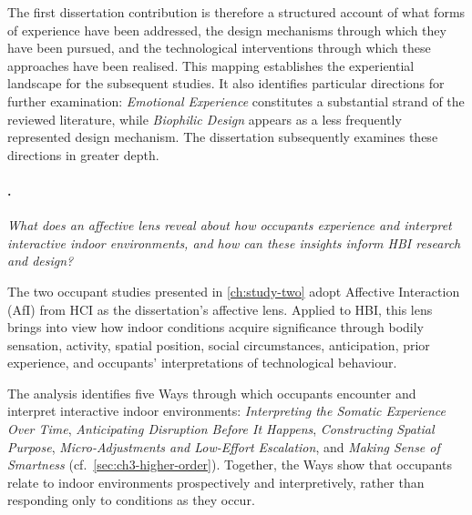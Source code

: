 The first dissertation contribution is therefore a structured account of what forms of experience have been addressed, the design mechanisms through which
they have been pursued, and the technological interventions through
which these approaches have been realised. This mapping establishes the experiential landscape for the subsequent studies. It also identifies particular directions for further examination: \textit{Emotional Experience} constitutes a substantial strand of the reviewed literature, while \textit{Biophilic Design} appears as a less frequently represented design mechanism. The dissertation subsequently examines these directions in greater depth.



\paragraph{.}

\emph{What does an affective lens reveal about how occupants experience
and interpret interactive indoor environments, and how can these
insights inform HBI research and design?}


The two occupant studies presented in \autoref{ch:study-two} adopt
Affective Interaction (AfI) from HCI as the dissertation's affective
lens. Applied to HBI, this lens brings into view how indoor conditions acquire significance through bodily sensation, activity, spatial position, social circumstances, anticipation, prior experience, and occupants' interpretations of technological behaviour.

The analysis identifies five Ways through which occupants encounter and interpret interactive indoor environments: \textit{Interpreting the Somatic Experience Over Time}, \textit{Anticipating Disruption Before It Happens}, \textit{Constructing Spatial Purpose}, \textit{Micro-Adjustments and Low-Effort Escalation}, and \textit{Making Sense of Smartness} (cf.~\autoref{sec:ch3-higher-order}). Together, the Ways show that occupants relate to indoor environments prospectively and interpretively, rather than responding only to conditions as they occur.

